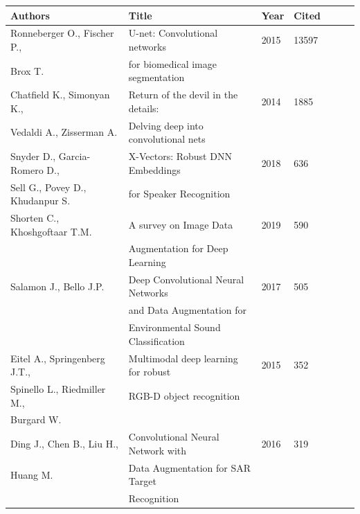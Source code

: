 \begin{table}[ht]
    \begin{center}
    \begin{tabular*}{\textwidth}{@{\extracolsep{\fill}}lllllll@{\extracolsep{\fill}}}
        \toprule
        Authors & Title & Year & Cited \\
        \midrule
        Ronneberger O., Fischer P., & U-net: Convolutional networks & 2015 & 13597 \\
        \vspace{.2cm}Brox T. & for biomedical image segmentation && \\

        Chatfield K., Simonyan K., & Return of the devil in the details: & 2014 & 1885 \\
        \vspace{.2cm}Vedaldi A., Zisserman A. & Delving deep into convolutional nets && \\

        Snyder D., Garcia-Romero D., & X-Vectors: Robust DNN Embeddings & 2018 & 636 \\
        \vspace{.2cm}Sell G., Povey D., Khudanpur S. & for Speaker Recognition && \\

        Shorten C., Khoshgoftaar T.M. & A survey on Image Data & 2019 & 590 \\
        \vspace{.2cm}                 & Augmentation for Deep Learning && \\

        Salamon J., Bello J.P. & Deep Convolutional Neural Networks & 2017 & 505 \\
                               & and Data Augmentation for \\
        \vspace{.2cm}          & Environmental Sound Classification \\

        Eitel A., Springenberg J.T., & Multimodal deep learning for robust & 2015 & 352 \\
        Spinello L., Riedmiller M., & RGB-D object recognition && \\
        \vspace{.2cm}Burgard W. &&& \\

        Ding J., Chen B., Liu H., & Convolutional Neural Network with & 2016 & 319 \\
        Huang M.                  & Data Augmentation for SAR Target && \\
        \vspace{.2cm}             & Recognition \\


\end{tabular*}
\end{center}
\end{table}
